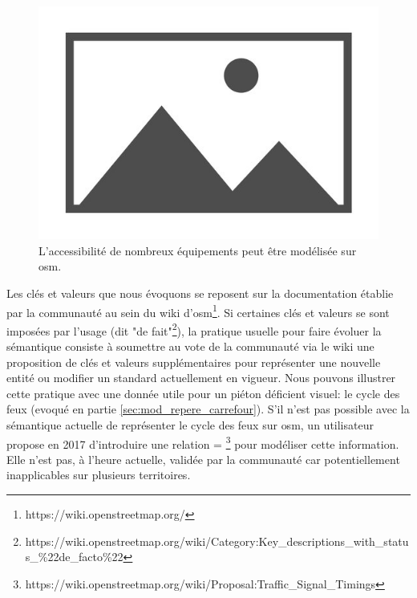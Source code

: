 \begin{figure}
    \centering
    \includegraphics{images/placeholder.jpg}
    \caption{L'accessibilité de nombreux équipements peut être modélisée sur \gls{osm}.}
    \label{fig:mod_ex_accessibilite_eqp_osm}
\end{figure}

\newpar{}


Les clés et valeurs que nous évoquons se reposent sur la documentation établie par la communauté au sein du wiki d'\gls{osm}\footnote{https://wiki.openstreetmap.org/}. Si certaines clés et valeurs se sont imposées par l'usage (dit "de fait"\footnote{https://wiki.openstreetmap.org/wiki/Category:Key\_descriptions\_with\_status\_\%22de\_facto\%22}), la pratique usuelle pour faire évoluer la sémantique consiste à soumettre au vote de la communauté via le wiki une proposition de clés et valeurs supplémentaires pour représenter une nouvelle entité ou modifier un standard actuellement en vigueur. Nous pouvons illustrer cette pratique avec une donnée utile pour un piéton déficient visuel: le cycle des feux (evoqué en partie \ref{sec:mod_repere_carrefour}). S'il n'est pas possible avec la sémantique actuelle de représenter le cycle des feux sur \gls{osm}, un utilisateur propose en 2017 d'introduire une relation = \footnote{https://wiki.openstreetmap.org/wiki/Proposal:Traffic\_Signal\_Timings} pour modéliser cette information. Elle n'est pas, à l'heure actuelle, validée par la communauté car potentiellement inapplicables sur plusieurs territoires.


